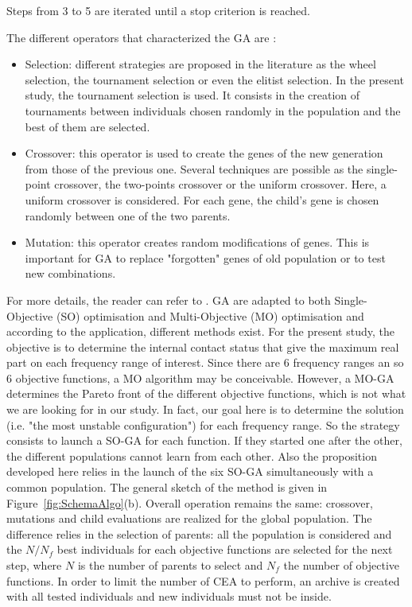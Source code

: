 \documentclass[final,1p]{elsarticle}
\begin{document}
Steps from 3 to 5 are iterated until a stop criterion is reached.

The different operators that characterized the GA are :
\begin{itemize}
	\item Selection: different strategies are proposed in the literature  as the wheel selection, the tournament selection or even the elitist selection. In the present study, the tournament selection is used. It consists in the creation of tournaments between individuals chosen randomly in the population and the best of them are selected.
	\item Crossover: this operator is used to create the genes of the new generation from those of the previous one. Several techniques are possible as the single-point crossover, the two-points crossover or the uniform crossover. Here, a uniform crossover is considered. For each gene, the child's gene is chosen randomly between one of the two parents.
	\item Mutation: this operator creates random modifications of genes. This is important for GA to replace "forgotten" genes of old population or to test new combinations.
\end{itemize}

For more details, the reader can refer to \cite{Deb2002Fast,whitley1994GA}. GA are adapted to both Single-Objective (SO) optimisation and Multi-Objective (MO) optimisation and according to the application, different methods exist. For the present study, the objective is to determine the internal contact status that give the maximum real part on each frequency range of interest. Since there are $6$ frequency ranges an so $6$ objective functions, a MO algorithm may be conceivable. However, a MO-GA determines the Pareto front of the different objective functions, which is not what we are looking for in our study. In fact, our goal here is to determine the solution (i.e. "the most unstable configuration") for each frequency range. So the strategy consists to launch a SO-GA for each function. If they started one after the other, the different populations cannot learn from each other. Also the proposition developed here relies in the launch of the six SO-GA simultaneously with a common population. The general sketch of the method is given in Figure~\ref{fig:SchemaAlgo}(b). Overall operation remains the same: crossover, mutations and child evaluations are realized for the global population. The difference relies in the selection of parents: all the population is considered and the $N/N_f$ best individuals for each objective functions are selected for the next step, where $N$ is the number of parents to select and $N_f$ the number of objective functions. In order to limit the number of CEA to perform, an archive is created with all tested individuals and new individuals must not be inside.
\end{document}
